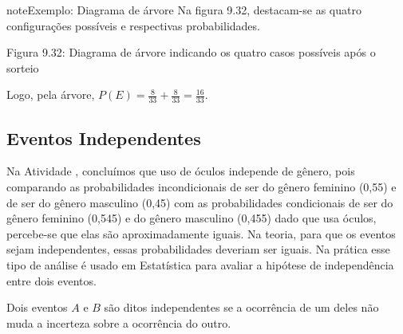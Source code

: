 \begin{sphinxadmonition}{note}{Exemplo: Diagrama de árvore}
Na figura 9.32, destacam-se as quatro configurações possíveis e respectivas probabilidades.
\begin{center}\end{center}
Figura 9.32: Diagrama de árvore indicando os quatro casos possíveis após o sorteio

Logo, pela árvore, \(P(E)=\frac{8}{33}+\frac{8}{33}=\frac{16}{33}\).
\end{sphinxadmonition}


\subsection{Eventos Independentes}
\label{\detokenize{PE511-7:id3}}\label{\detokenize{PE511-7:eventos-independentes}}
Na Atividade , concluímos que uso de óculos independe de gênero, pois  comparando as probabilidades incondicionais de ser do gênero feminino (0,55) e de ser do gênero masculino (0,45) com as probabilidades condicionais de ser do gênero feminino (0,545) e do gênero masculino (0,455) dado que usa óculos, percebe-se que elas são aproximadamente iguais. Na teoria, para que os eventos sejam independentes, essas probabilidades deveriam ser iguais. Na prática esse tipo de análise é usado em Estatística para avaliar a hipótese de independência entre dois eventos.
\begin{description}
\item[{Dois eventos \(A\) e \(B\) são ditos independentes se a ocorrência de um deles não muda a incerteza sobre a ocorrência do outro.}] \leavevmode{}\label{\detokenize{PE511-7:term-dois-eventos-e-sao-ditos-independentes-se-a-ocorrencia-de-um-deles-nao-muda-a-incerteza-sobre-a-ocorrencia-do-outro}}
\end{description}


